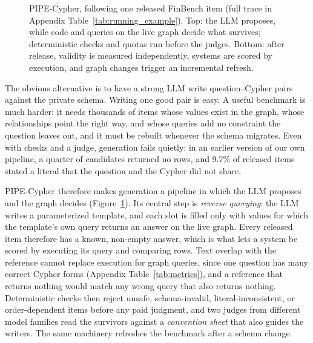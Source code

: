 \documentclass[11pt]{article}
\begin{document}
\begin{figure}[t]
\centering

\caption{PIPE-Cypher, following one released FinBench item (full trace in Appendix Table~\ref{tab:running_example}). Top: the LLM proposes, while code and queries on the live graph decide what survives; deterministic checks and quotas run before the judges. Bottom: after release, validity is measured independently, systems are scored by execution, and graph changes trigger an incremental refresh.}
\label{fig:pipeline}
\end{figure}

The obvious alternative is to have a strong LLM write question--Cypher pairs against the private schema. Writing one good pair is easy. A useful benchmark is much harder: it needs thousands of items whose values exist in the graph, whose relationships point the right way, and whose queries add no constraint the question leaves out, and it must be rebuilt whenever the schema migrates. Even with checks and a judge, generation fails quietly: in an earlier version of our own pipeline, a quarter of candidates returned no rows, and 9.7\% of released items stated a literal that the question and the Cypher did not share.

PIPE-Cypher therefore makes generation a pipeline in which the LLM proposes and the graph decides (Figure~\ref{fig:pipeline}). Its central step is \emph{reverse querying}: the LLM writes a parameterized template, and each slot is filled only with values for which the template's own query returns an answer on the live graph. Every released item therefore has a known, non-empty answer, which is what lets a system be scored by executing its query and comparing rows. Text overlap with the reference cannot replace execution for graph queries, since one question has many correct Cypher forms (Appendix Table~\ref{tab:metrics}), and a reference that returns nothing would match any wrong query that also returns nothing. Deterministic checks then reject unsafe, schema-invalid, literal-inconsistent, or order-dependent items before any paid judgment, and two judges from different model families read the survivors against a \emph{convention sheet} that also guides the writers. The same machinery refreshes the benchmark after a schema change.
\end{document}
